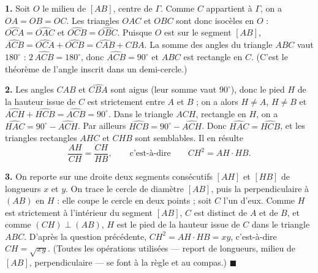 \textbf{1.} Soit $O$ le milieu de $[AB]$, centre de $\Gamma$. Comme $C$
appartient à $\Gamma$, on a $OA = OB = OC$. Les triangles $OAC$ et $OBC$
sont donc isocèles en $O$ : $\widehat{OCA} = \widehat{OAC}$ et
$\widehat{OCB} = \widehat{OBC}$. Puisque $O$ est sur le segment $[AB]$,
$\widehat{ACB} = \widehat{OCA} + \widehat{OCB} = \widehat{CAB} +
\widehat{CBA}$. La somme des angles du triangle $ABC$ vaut $180^\circ$ :
$2\,\widehat{ACB} = 180^\circ$, donc $\widehat{ACB} = 90^\circ$ et $ABC$
est rectangle en $C$. (C'est le théorème de l'angle inscrit dans un
demi-cercle.)

\medskip

\textbf{2.} Les angles $\widehat{CAB}$ et $\widehat{CBA}$ sont aigus
(leur somme vaut $90^\circ$), donc le pied $H$ de la hauteur issue de $C$
est strictement entre $A$ et $B$ ; on a alors $H \neq A$, $H \neq B$ et
$\widehat{ACH} + \widehat{HCB} = \widehat{ACB} = 90^\circ$.
Dans le triangle $ACH$, rectangle en $H$, on a
$\widehat{HAC} = 90^\circ - \widehat{ACH}$. Par ailleurs
$\widehat{HCB} = 90^\circ - \widehat{ACH}$. Donc $\widehat{HAC} = \widehat{HCB}$, et
les triangles rectangles $AHC$ et $CHB$ sont semblables. Il en résulte
\[
\frac{AH}{CH} = \frac{CH}{HB},
\qquad\text{c'est-à-dire}\qquad
CH^2 = AH \cdot HB.
\]

\medskip

\textbf{3.} On reporte sur une droite deux segments consécutifs
$[AH]$ et $[HB]$ de longueurs $x$ et $y$. On trace le cercle de
diamètre $[AB]$, puis la perpendiculaire à $(AB)$ en $H$ : elle coupe
le cercle en deux points ; soit $C$ l'un d'eux. Comme $H$ est strictement
à l'intérieur du segment $[AB]$, $C$ est distinct de $A$ et de $B$, et
comme $(CH) \perp (AB)$, $H$ est le pied de la hauteur issue de $C$ dans
le triangle $ABC$. D'après la question précédente,
$CH^2 = AH \cdot HB = xy$, c'est-à-dire $CH = \sqrt{xy}$. (Toutes les
opérations utilisées --- report de longueurs, milieu de $[AB]$,
perpendiculaire --- se font à la règle et au compas.) \hfill $\blacksquare$
